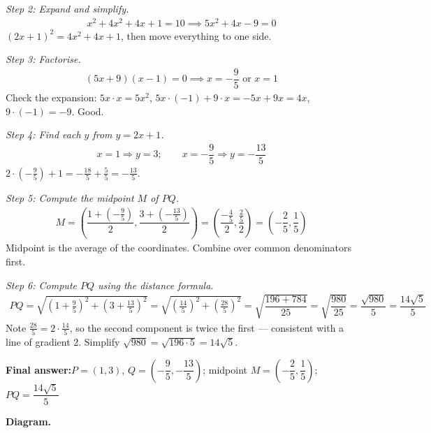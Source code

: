 \documentclass[11pt]{article}
\begin{document}
\textit{Step 2: Expand and simplify.}
\[\begin{gathered}
x^2 + 4x^2 + 4x + 1 = 10 \implies 5x^2 + 4x - 9 = 0
\end{gathered}\]
\( (2x+1)^2 = 4x^2 + 4x + 1 \), then move everything to one side.

\textit{Step 3: Factorise.}
\[\begin{gathered}
(5x + 9)(x - 1) = 0 \implies x = -\dfrac{9}{5} \text{ or } x = 1
\end{gathered}\]
Check the expansion: \( 5x \cdot x = 5x^2 \), \( 5x \cdot (-1) + 9 \cdot x = -5x + 9x = 4x \), \( 9 \cdot (-1) = -9 \). Good.

\textit{Step 4: Find each \( y \) from \( y = 2x + 1 \).}
\[\begin{gathered}
x = 1 \Rightarrow y = 3; \qquad x = -\dfrac{9}{5} \Rightarrow y = -\dfrac{13}{5}
\end{gathered}\]
\( 2 \cdot (-\tfrac{9}{5}) + 1 = -\tfrac{18}{5} + \tfrac{5}{5} = -\tfrac{13}{5} \).

\textit{Step 5: Compute the midpoint \( M \) of \( PQ \).}
\[\begin{gathered}
M = \left( \dfrac{1 + (-\tfrac{9}{5})}{2}, \dfrac{3 + (-\tfrac{13}{5})}{2} \right) = \left( \dfrac{-\tfrac{4}{5}}{2}, \dfrac{\tfrac{2}{5}}{2} \right) = \left( -\dfrac{2}{5}, \dfrac{1}{5} \right)
\end{gathered}\]
Midpoint is the average of the coordinates. Combine over common denominators first.

\textit{Step 6: Compute \( PQ \) using the distance formula.}
\[\begin{gathered}
PQ = \sqrt{\left(1 + \tfrac{9}{5}\right)^2 + \left(3 + \tfrac{13}{5}\right)^2} = \sqrt{\left(\tfrac{14}{5}\right)^2 + \left(\tfrac{28}{5}\right)^2} = \sqrt{\dfrac{196 + 784}{25}} = \sqrt{\dfrac{980}{25}} = \dfrac{\sqrt{980}}{5} = \dfrac{14\sqrt{5}}{5}
\end{gathered}\]
Note \( \tfrac{28}{5} = 2 \cdot \tfrac{14}{5} \), so the second component is twice the first --- consistent with a line of gradient 2. Simplify \( \sqrt{980} = \sqrt{196 \cdot 5} = 14\sqrt{5} \).

\begin{answerbox}
\textbf{Final answer:}\quad \(\displaystyle P = (1, 3)\), \(\displaystyle Q = \left(-\dfrac{9}{5}, -\dfrac{13}{5}\right)\); midpoint \(\displaystyle M = \left(-\dfrac{2}{5}, \dfrac{1}{5}\right)\); \(\displaystyle PQ = \dfrac{14\sqrt{5}}{5}\)
\end{answerbox}
\textbf{Diagram.}
\end{document}
